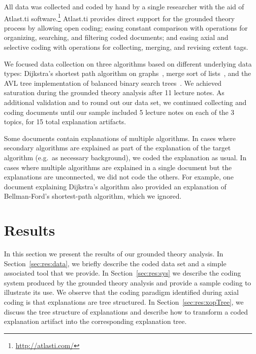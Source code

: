 \documentclass[sigconf]{acmart}
\begin{document}
All data was collected and coded by hand by a single researcher with the aid of
Atlast.ti software.\footnote{\url{http://atlasti.com/}}
%
Atlast.ti provides direct support for the grounded theory process by allowing
open coding; easing constant comparison with operations for organizing,
searching, and filtering coded documents; and easing axial and selective coding
with operations for collecting, merging, and revising extent tags.


We focused data collection on three algorithms based on different underlying
data types: Dijkstra's shortest path algorithm on
graphs~\cite[pp.~137--142]{KT06}, merge sort of lists~\cite[210--214]{KT06},
and the AVL tree implementation of balanced binary search
trees~\cite[pp.~458--475]{KnuthArt3}.
%
We achieved saturation during the grounded theory analysis after 11 lecture
notes. As additional validation and to round out our data set, we continued
collecting and coding documents until our sample included 5 lecture notes on
each of the 3 topics, for 15 total explanation artifacts.


Some documents contain explanations of multiple algorithms. In cases where
secondary algorithms are explained as part of the explanation of the target
algorithm (e.g.\ as necessary background), we coded the explanation as usual.
In cases where multiple algorithms are explained in a single document but the
explanations are unconnected, we did not code the others. For example, one
document explaining Dijkstra's algorithm also provided an explanation of
Bellman-Ford's shortest-path algorithm, which we ignored.





\section{Results}
\label{sec:res}

In this section we present the results of our grounded theory analysis.
%
In Section~\ref{sec:res:data}, we briefly describe the coded data set and a
simple associated tool that we provide.
%
In Section~\ref{sec:res:sys} we describe the coding system produced by the
grounded theory analysis and provide a sample coding to illustrate its use. We
observe that the coding paradigm identified during axial coding is that
explanations are tree structured.
%
In Section~\ref{sec:res:xopTree}, we discuss the tree structure of explanations
and describe how to transform a coded explanation artifact into the
corresponding explanation tree.
\end{document}
